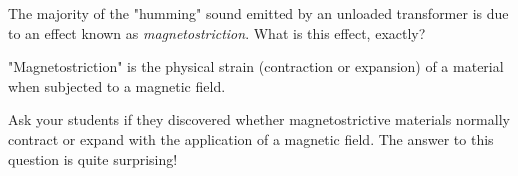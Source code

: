

The majority of the "humming" sound emitted by an unloaded transformer is due to an effect known as {\it magnetostriction}.  What is this effect, exactly?







"Magnetostriction" is the physical strain (contraction or expansion) of a material when subjected to a magnetic field.







Ask your students if they discovered whether magnetostrictive materials normally contract or expand with the application of a magnetic field.  The answer to this question is quite surprising!




